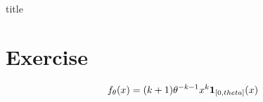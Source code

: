 \documentclass[12pt]{article}
\begin{document}
{title}

\tableofcontents


\section{Exercise}
\begin{equation}
    f_{\theta}(x) = (k+1) \theta^{-k-1} x^k \mathbf{1}_{[0, theta]} (x)
\end{equation}

\end{document}

